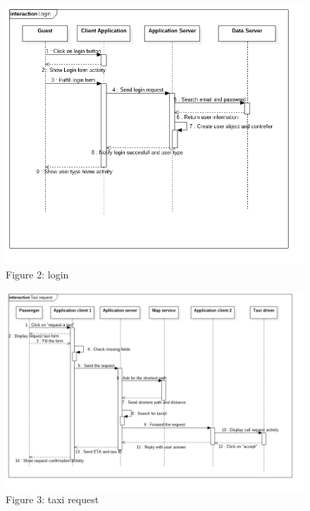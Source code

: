 \begin{figure} [h]
\centering\includegraphics[scale=0.5]{Sequence Diagrams/login.png}
\caption{Figure 2: login }
\end{figure}

\begin{figure} [h]
\centering\includegraphics[scale=0.5]{Sequence Diagrams/successfully_taxi_request.png}
\caption{Figure 3: taxi request }
\end{figure}


